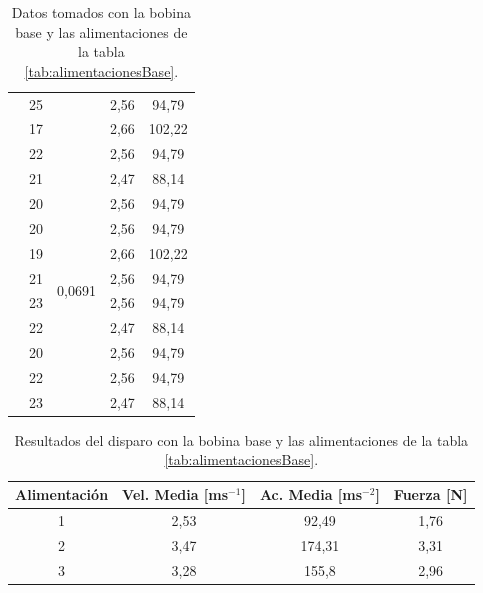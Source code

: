 \begin{table}[H]
\begin{tabular}{|c|c|c|c|c|}
                        & 25     &                          & 2,56      & 94,79       \\
                        & 17     &                          & 2,66      & 102,22      \\
                        & 22     &                          & 2,56      & 94,79       \\
    \hdashline[2pt/5pt]
    \multirow{10}{*}{3} & 21     & \multirow{10}{*}{0,0691} & 2,47      & 88,14       \\
                        & 20     &                          & 2,56      & 94,79       \\
                        & 20     &                          & 2,56      & 94,79       \\
                        & 19     &                          & 2,66      & 102,22      \\
                        & 21     &                          & 2,56      & 94,79       \\
                        & 23     &                          & 2,56      & 94,79       \\
                        & 22     &                          & 2,47      & 88,14       \\
                        & 20     &                          & 2,56      & 94,79       \\
                        & 22     &                          & 2,56      & 94,79       \\
                        & 23     &                          & 2,47      & 88,14       \\
    \hline
    \end{tabular}
    \caption{Datos tomados con la bobina base y las alimentaciones de la tabla \ref{tab:alimentacionesBase}.}
    \label{tab:datosBase}
\end{table}

\begin{table}[H]
    \centering
    \setlength{\tabcolsep}{5pt}
    \renewcommand{\arraystretch}{1.2}
    \begin{tabular}{|c|c|c|c|}
        \hline
        \textbf{Alimentación} & \textbf{Vel. Media [ms\(^{-1}\)]} & \textbf{Ac. Media [ms\(^{-2}\)]} & \textbf{Fuerza [N]} \\
        \hline
        1 & 2,53 & 92,49 & 1,76 \\
        2 & 3,47 & 174,31 & 3,31 \\
        3 & 3,28 & 155,8 & 2,96 \\
        \hline
    \end{tabular}
    \caption{Resultados del disparo con la bobina base y las alimentaciones de la tabla \ref{tab:alimentacionesBase}.}
    \label{tab:resultadosBase}
\end{table}
\restoregeometry

